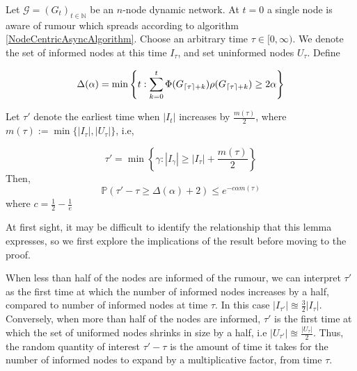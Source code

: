 \begin{lemma} \label{AsyncIncreaseLemma}
	Let $\mathcal{G}=(G_t)_{t \in \mathbb{N}}$ be an $n$-node dynamic network. At $t=0$ a single node is aware of rumour which spreads according to algorithm \ref{NodeCentricAsyncAlgorithm}. Choose an arbitrary time $\tau \in [0, \infty)$. We denote the set of informed nodes at this time $I_\tau$, and set uninformed nodes $U_\tau$.
	\noindent
	Define 
	
	$$
	\Delta(\alpha) = \min \left\{t: \sum_{k=0}^t \Phi(G_{\lceil\tau\rceil+k})\rho(G_{\lceil\tau\rceil+k}) \geq 2 \alpha \right\}
	$$

	\noindent
	Let $\tau'$ denote the earliest time when $|I_t|$ increases by $\frac{m(\tau)}{2}$, where $m(\tau) := \min\{|I_\tau|, |U_\tau|\}$, i.e,

	$$
		\tau' = \min\left\{\gamma : |I_{\gamma}| \geq |I_\tau| + \frac{m(\tau)}{2}\right\}
	$$
	\noindent
	Then, 
	$$
		\mathbb{P}(\tau' - \tau \geq \Delta(\alpha) + 2) \leq e^{-c\alpha m(\tau)}
	$$
	\noindent
	where $c = \frac{1}{2} - \frac{1}{e}$
\end{lemma}


At first sight, it may be difficult to identify the relationship that this lemma expresses, so we first explore the implications of the result before moving to the proof.

When less than half of the nodes are informed of the rumour, we can interpret $\tau'$ as the first time at which the number of informed nodes increases by a half, compared to number of informed nodes at time $\tau$. In this case $|I_{\tau'}| \approxeq \frac{3}{2} |I_\tau|$. Conversely, when more than half of the nodes are informed, $\tau'$ is the first time at which the set of uniformed nodes shrinks in size by a half, i.e $|U_{\tau'}| \approxeq \frac{|U_\tau|}{2}$. Thus, the random quantity of interest $\tau'-\tau$ is the amount of time it takes for the number of informed nodes to expand by a multiplicative factor, from time $\tau$. 


